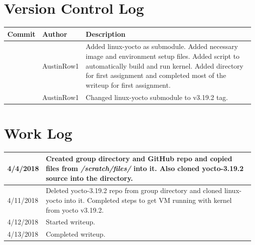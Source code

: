\documentclass[onecolumn,draftclsnofoot, 10pt, compsoc]{IEEEtran}
\begin{document}
\section{Version Control Log}
	\begin{tabular}{|p{5cm}|p{5cm}|p{5cm}|}
		\hline
		\textbf{Commit} & \textbf{Author} & \textbf{Description}\\
		\hline
		\textcolor{blue}{\underline{\href[pdfnewwindow=true]{https://github.com/AustinRow1/OperatingSystems2/commit/a16450931755558a70be019c26f54b8a1c2c63d1}{a164509}}} & AustinRow1 & Added linux-yocto as submodule. Added necessary image and environment setup files. Added script to automatically build and run kernel. Added directory for first assignment and completed most of the writeup for first assignment.\\\hline
		\textcolor{blue}{\underline{\href[pdfnewwindow=true]{https://github.com/AustinRow1/OperatingSystems2/commit/41ff2f23ebb0a8e9ab44df4e0ff71790bc135c44}{41ff2f2}}} & AustinRow1 & Changed linux-yocto submodule to v3.19.2 tag.\\\hline
	\end{tabular}

\section{Work Log}
\begin{center}
	\begin{tabular}{ |p{2cm}|p{12cm}| }
		\hline
		4/4/2018 & Created group directory and GitHub repo and copied files from \textit{/scratch/files/} into it.
		           Also cloned yocto-3.19.2 source into the directory. \\
		\hline
		4/11/2018 & Deleted yocto-3.19.2 repo from group directory and cloned linux-yocto into it.
		            Completed steps to get VM running with kernel from yocto v3.19.2. \\
		\hline
		4/12/2018 & Started writeup. \\
		\hline
		4/13/2018 & Completed writeup. \\
		\hline
	\end{tabular}
\end{center}
 
%
%
\end{document}
